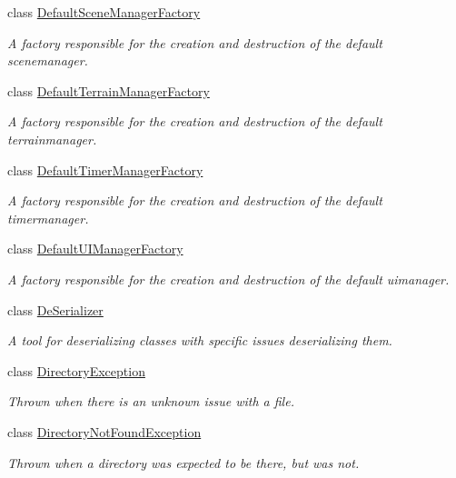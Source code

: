 \begin{DoxyCompactItemize}
class \hyperlink{classMezzanine_1_1DefaultSceneManagerFactory}{Default\-Scene\-Manager\-Factory}
\begin{DoxyCompactList}\small\item\em A factory responsible for the creation and destruction of the default scenemanager. \end{DoxyCompactList}\item 
class \hyperlink{classMezzanine_1_1DefaultTerrainManagerFactory}{Default\-Terrain\-Manager\-Factory}
\begin{DoxyCompactList}\small\item\em A factory responsible for the creation and destruction of the default terrainmanager. \end{DoxyCompactList}\item 
class \hyperlink{classMezzanine_1_1DefaultTimerManagerFactory}{Default\-Timer\-Manager\-Factory}
\begin{DoxyCompactList}\small\item\em A factory responsible for the creation and destruction of the default timermanager. \end{DoxyCompactList}\item 
class \hyperlink{classMezzanine_1_1DefaultUIManagerFactory}{Default\-U\-I\-Manager\-Factory}
\begin{DoxyCompactList}\small\item\em A factory responsible for the creation and destruction of the default uimanager. \end{DoxyCompactList}\item 
class \hyperlink{classMezzanine_1_1DeSerializer}{De\-Serializer}
\begin{DoxyCompactList}\small\item\em A tool for deserializing classes with specific issues deserializing them. \end{DoxyCompactList}\item 
class \hyperlink{classMezzanine_1_1DirectoryException}{Directory\-Exception}
\begin{DoxyCompactList}\small\item\em Thrown when there is an unknown issue with a file. \end{DoxyCompactList}\item 
class \hyperlink{classMezzanine_1_1DirectoryNotFoundException}{Directory\-Not\-Found\-Exception}
\begin{DoxyCompactList}\small\item\em Thrown when a directory was expected to be there, but was not. \end{DoxyCompactList}\item 

\end{DoxyCompactItemize}
